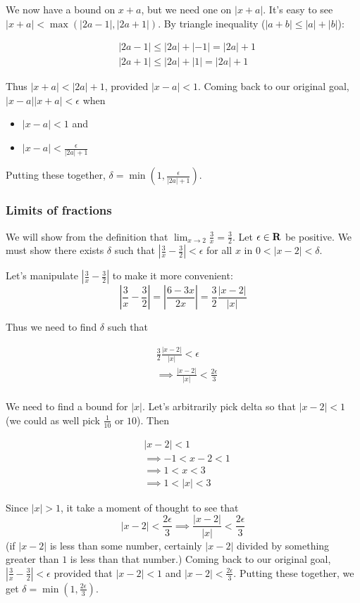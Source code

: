 We now have a bound on $x+a$, but we need one on $|x+a|$. It's easy to
see $|x+a|<\max(|2a-1|, |2a+1|)$. By triangle inequality
($|a+b|\leq|a|+|b|$):

\begin{align*}
    &|2a-1|\leq|2a|+|-1|=|2a|+1\\
    &|2a+1|\leq|2a|+|1|=|2a|+1
\end{align*}

Thus $|x+a|<|2a|+1$, provided $|x-a|<1$. Coming back to our original
goal, $|x-a||x+a|<\epsilon$ when

\begin{itemize}
    \item $|x-a|<1$ and
    \item $|x-a|<\frac{\epsilon}{|2a|+1}$
\end{itemize}

Putting these together, $\delta=\min(1, \frac{\epsilon}{|2a|+1})$.

\subsubsection*{Limits of fractions}

We will show from the definition that
$\lim_{x\to 2}\frac{3}{x}=\frac{3}{2}$. Let $\epsilon\in\mathbf{R}$ be positive. We must
show there exists $\delta$ such that
$|\frac{3}{x}-\frac{3}{2}|<\epsilon$ for all $x$ in $0<|x-2|<\delta$.

\vs

Let's manipulate $|\frac{3}{x}-\frac{3}{2}|$ to make it more convenient:
\[\left|\frac{3}{x}-\frac{3}{2}\right|=\left|\frac{6-3x}{2x}\right|=\frac{3}{2}\frac{|x-2|}{|x|}\]

Thus we need to find $\delta$ such that

\begin{align*}
&\frac{3}{2}\frac{|x-2|}{|x|}<\epsilon\\
&\implies \frac{|x-2|}{|x|}<\frac{2\epsilon}{3}\\
\end{align*}

We need to find a bound for $|x|$. Let's arbitrarily pick delta so
that $|x-2|<1$ (we could as well pick $\frac{1}{10}$ or $10$). Then

\begin{align*}
    &|x-2|<1\\
    &\implies -1<x-2<1\\
    &\implies 1<x<3\\
    &\implies 1<|x|<3
\end{align*}

Since $|x|>1$, it take a moment of thought to see that
\[|x-2|<\frac{2\epsilon}{3}\implies\frac{|x-2|}{|x|}<\frac{2\epsilon}{3}\]
(if $|x-2|$ is less than some number, certainly $|x-2|$ divided by something greater than $1$ is less than that number.) Coming back to our original goal, $|\frac{3}{x}-\frac{3}{2}|<\epsilon$ provided that $|x-2|<1$ and $|x-2|<\frac{2\epsilon}{3}$. Putting these together, we get $\delta=\min(1, \frac{2\epsilon}{3})$.

